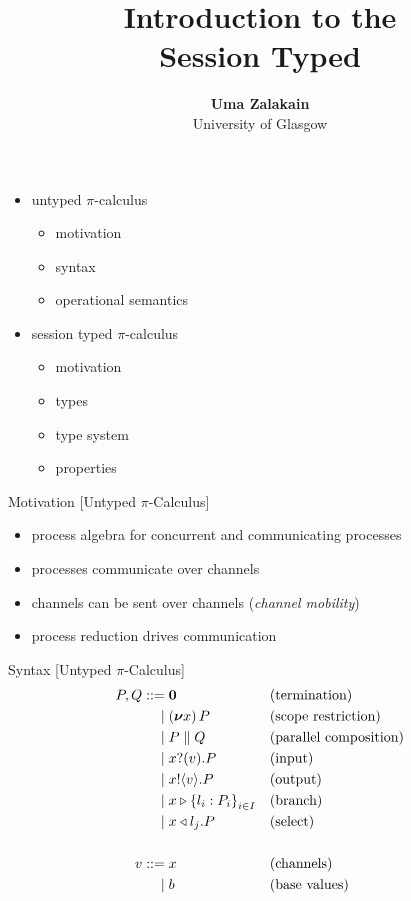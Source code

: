 \documentclass[dvipsnames]{beamer}
\date{}
\title{Introduction to the\\ Session Typed \Picalc{}}
\author{\textbf{Uma Zalakain}\\ University of Glasgow}
\newcommand{\sitem}{\item[\raisebox{.45ex}{\rule{.6ex}{.6ex}}]}
\newcommand{\picalc}{$\pi$-calculus}
\newcommand{\Picalc}{$\pi$-Calculus}
\newcommand{\PO}{\boldsymbol{0}}
\newcommand{\comp}[2]{#1 \parallel #2}
\newcommand{\new}[1]{(\boldsymbol{\nu} #1) \,}
\newcommand{\send}[2]{#1 !\langle #2 \rangle .}
\newcommand{\recv}[2]{#1 ?( #2 ) .}
\newcommand{\branch}[3]{#1 \triangleright \left\{l_{#2} : #3_{#2}\right\}_{#2 \in \uppercase{#2}}}
\newcommand{\select}[2]{#1 \triangleleft l_{#2} .}
\newcommand{\slidetitle}[2]{#2 \hspace*{\fill} [#1]}
\begin{document}
  \maketitle

  \begin{frame}
    \begin{itemize}
      \setlength\itemsep{1em}
      \sitem untyped \picalc{}
        \begin{itemize}
          \sitem motivation
          \sitem syntax
          \sitem operational semantics
        \end{itemize}
      \sitem session typed \picalc{}
        \begin{itemize}
          \sitem motivation
          \sitem types
          \sitem type system
          \sitem properties
        \end{itemize}
    \end{itemize}
  \end{frame}

  \begin{frame}{\slidetitle{Untyped \Picalc{}}{Motivation}}
    \begin{itemize}
      \setlength\itemsep{1em}
      \sitem process algebra for concurrent and communicating processes
      \sitem processes communicate over channels
      \sitem channels can be sent over channels (\emph{channel mobility})
      \sitem process reduction drives communication
    \end{itemize}
  \end{frame}
  
  \begin{frame}{\slidetitle{Untyped \Picalc{}}{Syntax}}
    \begin{equation*}
      \begin{aligned}
        P, Q ::=& \; \PO       &&\text{(termination)}    \\ 
        |& \; \new{x}P         &&\text{(scope restriction)} \\ 
        |& \; \comp{P}{Q}      &&\text{(parallel composition)} \\ 
        |& \; \recv{x}{v}P     &&\text{(input)}       \\ 
        |& \; \send{x}{v}P     &&\text{(output)}       \\           
        |& \; \branch{x}{i}{P} &&\text{(branch)}       \\ 
        |& \; \select{x}{j}P   &&\text{(select)}       \\           
        \\
        v ::=& \; x && \text{(channels)}\\
        | & \; b && \text{(base values)}\\
      \end{aligned}
    \end{equation*}
  \end{frame}
\end{document}
